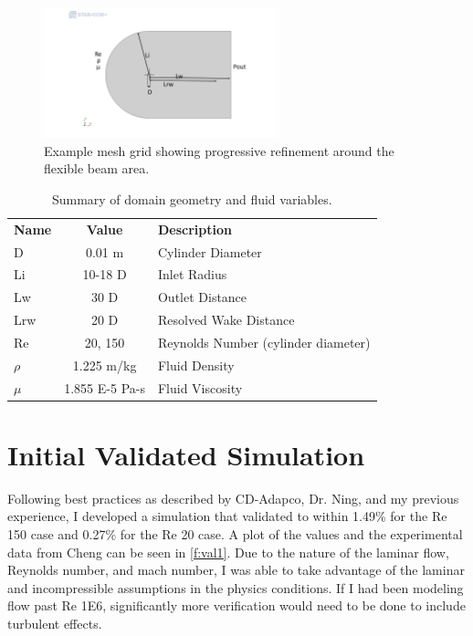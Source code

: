 \documentclass[10pt,english]{article}
\begin{document}
\begin{figure}[h!]
\centering
\includegraphics[trim={6.5cm 2.5cm 4.0cm 3cm},clip,width=0.60\textwidth]{domain}
\caption{Example mesh grid showing progressive refinement around the flexible beam area.}
\label{f:domain}
\end{figure}

\begin{table}[h]
\vspace{20pt}
\centering
  \begin{tabular}{lcl}
    \textbf{Name} & \textbf{Value} & \textbf{Description}  \\
    D & 0.01 m & Cylinder Diameter  \\
    Li & 10-18 D & Inlet Radius\\
    Lw & 30 D & Outlet Distance\\
    Lrw & 20 D & Resolved Wake Distance\\
    Re & 20, 150 & Reynolds Number (cylinder diameter)\\
    $\rho$  & 1.225 m/kg & Fluid Density\\
    $\mu$  & 1.855 E-5 Pa-s & Fluid Viscosity\\ 
  \end{tabular}
  \caption{Summary of domain geometry and fluid variables.}
  \label{tab:params}
\end{table}



\vspace{5pt}
\section{Initial Validated Simulation}

Following best practices as described by CD-Adapco, Dr. Ning, and my previous experience, I developed a simulation that validated to within 1.49\% for the Re 150 case and 0.27\% for the Re 20 case.  A plot of the values and the experimental data from Cheng can be seen in \cref{f:val1}.  Due to the nature of the laminar flow, Reynolds number, and mach number, I was able to take advantage of the laminar and incompressible assumptions in the physics conditions.  If I had been modeling flow past Re 1E6, significantly more verification would need to be done to include turbulent effects.
\end{document}
